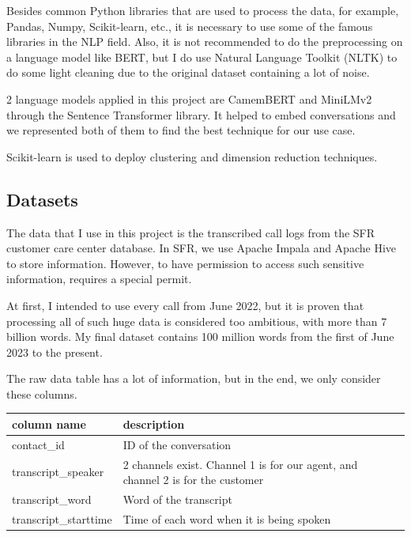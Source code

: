 Besides common Python libraries that are used to process the data, for example, Pandas, Numpy, Scikit-learn, etc., it is necessary to use some of the famous libraries in the NLP field. Also, it is not recommended to do the preprocessing on a language model like BERT, but I do use Natural Language Toolkit (NLTK)\cite{bird2009natural} to do some light cleaning due to the original dataset containing a lot of noise. 

2 language models applied in this project are CamemBERT\cite{martin2020camembert} and MiniLMv2\cite{wang2021minilmv2} through the Sentence Transformer library. It helped to embed conversations and we represented both of them to find the best technique for our use case.

Scikit-learn is used to deploy clustering and dimension reduction techniques.

\subsection{Datasets}

The data that I use in this project is the transcribed call logs from the SFR customer care center database. In SFR, we use Apache Impala and Apache Hive to store information. However, to have permission to access such sensitive information, requires a special permit.

At first, I intended to use every call from June 2022, but it is proven that processing all of such huge data is considered too ambitious, with more than 7 billion words. My final dataset contains 100 million words from the first of June 2023 to the present.

The raw data table has a lot of information, but in the end, we only consider these columns.

\begin{table}[H]
\centering
{} \label{tab:description_database} 
\begin{tabular}{|lp{10cm}|lp{10cm}|}
\hline
\textbf{column name}  & \textbf{description}                                                                  \\ \hline
contact\_id           & ID of the conversation                                                                \\ \hline
transcript\_speaker   & 2 channels exist. Channel 1 is for our agent, and channel 2 is for the customer \\ \hline
transcript\_word      & Word of the transcript                                                                \\ \hline
transcript\_starttime & Time of each word when it is being spoken                                             \\ \hline
\end{tabular}
\end{table}

